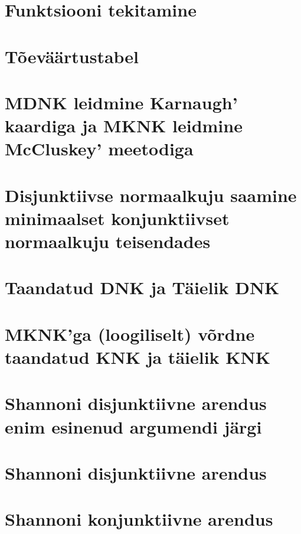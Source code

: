 \documentclass{article}
\begin{document}

\section{Funktsiooni tekitamine}

\section{Tõeväärtustabel}

\section{MDNK leidmine Karnaugh' kaardiga ja MKNK leidmine McCluskey' meetodiga}

\section{Disjunktiivse normaalkuju saamine minimaalset konjunktiivset normaalkuju teisendades}

\section{Taandatud DNK ja Täielik DNK}

\section{MKNK'ga (loogiliselt) võrdne taandatud KNK ja täielik KNK}

\section{Shannoni disjunktiivne arendus enim esinenud argumendi järgi}

\section{Shannoni disjunktiivne arendus }
\section{Shannoni konjunktiivne arendus}
\end{document}
